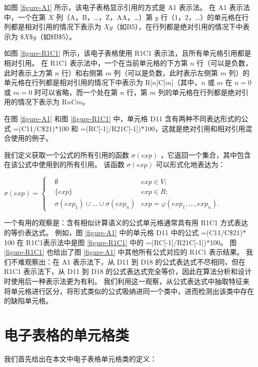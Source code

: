 如图 \ref{figure-A1} 所示，该电子表格显示引用的方式是 A1 表示法。
在 A1 表示法中，一个在第 $X$ 列（A，B，\dots，Z，AA，\dots）第 $y$ 行（1，2，\dots）的单元格在行列都是相对引用的情况下表示为 $Xy$（如B5），在行列都是绝对引用的情况下中表示为 $\$X\$y$（如\$B\$5）。

如图 \ref{figure-R1C1} 所示，该电子表格使用 R1C1 表示法，且所有单元格引用都是相对引用。
在 R1C1 表示法中，一个在当前单元格的下方第 $n$ 行（可以是负数，此时表示上方第 $n$ 行）和右侧第 $m$ 列（可以是负数，此时表示左侧第 $m$ 列）的单元格在行列都是相对引用的情况下中表示为 R[$n$]C[$m$]（其中，$n$ 或 $m$ 在 $n=0$ 或 $m=0$ 时可以省略，而一个处在第 $n$ 行，第 $m$ 列的单元格在行列都是绝对引用的情况下表示为 R$n$C$m$。

在图 \ref{figure-A1} 和图 \ref{figure-R1C1} 中，单元格 D11 含有两种不同表达形式的公式 =(C11$/$C\$21)$*$100 和 =(RC[-1]$/$R21C[-1])$*$100，这就是绝对引用和相对引用混合使用的例子。

我们定义获取一个公式的所有引用的函数 $\sigma(exp)$ ，它返回一个集合，其中包含在该公式中使用到的所有引用。
该函数 $\sigma(exp)$ 可以形式化地表达为：
\begin{definition}
$
\sigma(exp) = 
\left\{
    \begin{aligned}
       & \emptyset & exp \in V; \\
       & \{exp\}     & exp \in R; \\
       & \sigma(exp_1) \cup \dots \cup \sigma(exp_n) & exp = \varphi(exp_1, \dots , exp_n).
    \end{aligned}
\right.
$
\end{definition}

一个有用的观察是：含有相似计算语义的公式单元格通常具有用 R1C1 方式表达的等价表达式。
例如，图 \ref{figure-A1} 中的单元格 D11 中的公式 =(C11$/$C\$21)$*$100 在 R1C1表示法中是图 \ref{figure-R1C1} 中的 =(RC[-1]$/$R21C[-1])$*$100。
图 \ref{figure-R1C1} 也给出了图 \ref{figure-A1} 中其他所有公式对应的 R1C1 表示结果。
我们不难观察出：在 A1 表示法下，从 D11 到 D18 的公式表达式不尽相同，但在 R1C1 表示法下，从 D11 到 D18 的公式表达式完全等价，因此在算法分析和设计时使用后一种表示法更为有利。
我们利用这一观察，从公式表达式中抽取特征来将单元格进行区分，将形式类似的公式吸纳进同一个类中，进而检测出该类中存在的缺陷单元格。




\section{电子表格的单元格类}
我们首先给出在本文中电子表格单元格类的定义：

